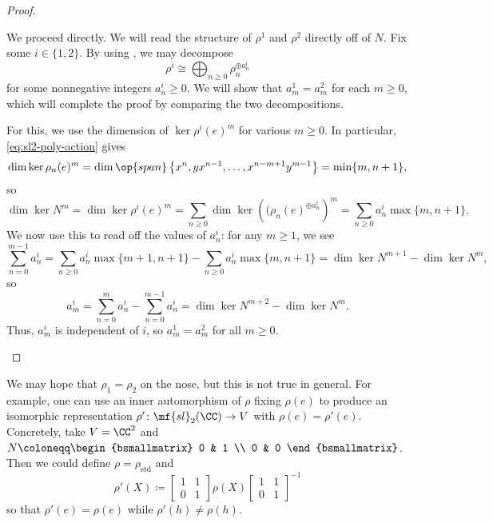 \documentclass[../notes.tex]{subfiles}
\begin{document}
\begin{proof}
\begin{listalph}
		\item We proceed directly. We will read the structure of $\rho^1$ and $\rho^2$ directly off of $N$. Fix some $i\in\{1,2\}$. By using , we may decompose
		\[\rho^i\cong\bigoplus_{n\ge0}\rho_n^{\oplus a_n^i}\]
		for some nonnegative integers $a_{n}^i\ge0$. We will show that $a_{m}^1=a_{m}^2$ for each $m\ge0$, which will complete the proof by comparing the two decompositions.
		
		For this, we use the dimension of $\ker\rho^i(e)^m$ for various $m\ge0$. In particular, \eqref{eq:sl2-poly-action} gives
		\[\dim\ker\rho_n(e)^m=\dim\op{span}\left\{x^n,yx^{n-1},\ldots,x^{n-m+1}y^{m-1}\right\}=\min\{m,n+1\},\]
		so
		\[\dim\ker N^m=\dim\ker\rho^i(e)^m=\sum_{n\ge0}\dim\ker\left((\rho_n(e)^{\oplus a_n^i}\right)^m=\sum_{n\ge0}a_n^i\max\{m,n+1\}.\]
		We now use this to read off the values of $a_n^i$: for any $m\ge1$, we see
		\[\sum_{n=0}^{m-1}a_n^i=\sum_{n\ge0}a_n^i\max\{m+1,n+1\}-\sum_{n\ge0}a_n^i\max\{m,n+1\}=\dim\ker N^{m+1}-\dim\ker N^m,\]
		so
		\[a_m^i=\sum_{n=0}^{m}a_n^i-\sum_{n=0}^{m-1}a_n^i=\dim\ker N^{m+2}-\dim\ker N^m.\]
		Thus, $a_m^i$ is independent of $i$, so $a_m^1=a_m^2$ for all $m\ge0$.
		\qedhere
	\end{listalph}
\end{proof}
\begin{example}
	We may hope that $\rho_1=\rho_2$ on the nose, but this is not true in general. For example, one can use an inner automorphism of $\rho$ fixing $\rho(e)$ to produce an isomorphic representation $\rho'\colon\mf{sl}_2(\CC)\to V$ with $\rho(e)=\rho'(e)$. Concretely, take $V=\CC^2$ and $N\coloneqq\begin{bsmallmatrix}
		0 & 1 \\ 0 & 0
	\end{bsmallmatrix}$. Then we could define $\rho=\rho_{\mathrm{std}}$ and
	\[\rho'(X)\coloneqq\begin{bmatrix}
		1 & 1 \\ 0 & 1
	\end{bmatrix}\rho(X)\begin{bmatrix}
		1 & 1 \\ 0 & 1
	\end{bmatrix}^{-1}\]
	so that $\rho'(e)=\rho(e)$ while $\rho'(h)\ne\rho(h)$.
\end{example}
\end{document}
